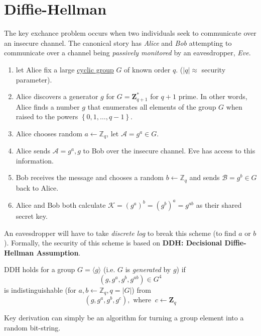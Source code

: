 
\section{Diffie-Hellman}
The key exchance problem occurs when two individuals seek to communicate over an insecure channel. The canonical story has \emph{Alice} and \emph{Bob} attempting to communicate over a channel being \emph{passively monitored} by an eavesdropper, \emph{Eve}.

\begin{definition}
	\begin{enumerate}
		\,
		\item let Alice fix a large \hyperref[def:cyclicgroup]{cyclic group} \(G\) of known order \(q\). (\(|q| \approx \) security parameter).
		\item Alice discovers a generator \(g\) for \(G = \mathbf{Z} _{q+1}^*\) for \(q+1\) prime. In other words, Alice finds a number \(g\) that enumerates all elements of the group \(G\) when raised to the powers \(\left\{ 0, 1, \ldots , q - 1 \right\} \).
		\item Alice chooses random \(a \gets \mathbb{Z} _q\), let \(\mathcal{A} = g^a \in G\).
		\item Alice sends \(\mathcal{A} = g^a, g\)  to Bob over the insecure channel. Eve has access to this information.
		\item Bob receives the message and chooses a random \(b \gets \mathbb{Z} _q\) and sends \(\mathcal{B} = g^b \in G\) back to Alice.
		\item Alice and Bob both calculate \(\mathcal{K} = (g^a)^b = (g^b)^a = g^{ab}\) as their shared secret key.  
	\end{enumerate}
\end{definition}

An eavesdropper will have to take \emph{discrete log} to break this scheme (to find \(a\) or \(b\)). Formally, the security of this scheme is based on \textbf{DDH: Decisional Diffie-Hellman Assumption}.

\begin{definition}\label{ddh}
	DDH holds for a group \(G = \langle g \rangle \) (i.e. \(G\) is \emph{generated} by \(g\)) if \[(g, g^a, g^b, g^{ab}) \in G^4\] is indistinguishable (for \(a, b \gets \mathbb{Z} _q, q = |G|\)) from \[(g, g^a, g^b, g^c), \text{ where }\: c \gets \mathbf{Z} _q\]
\end{definition}
\begin{remark}
	Key derivation can simply be an algorithm for turning a group element into a random bit-string.
\end{remark}

